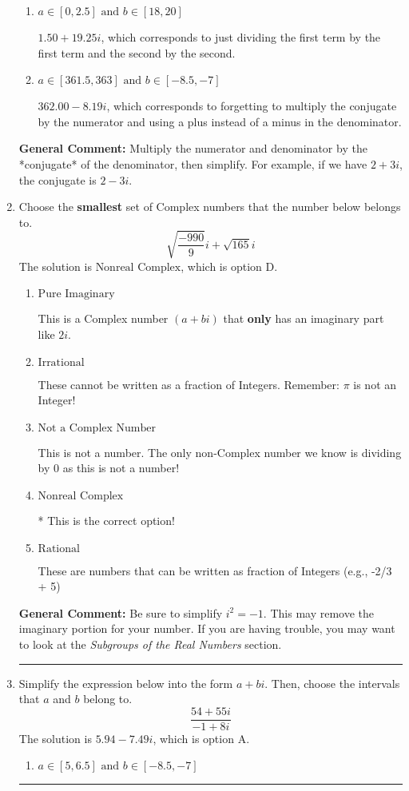 \documentclass{extbook}[14pt]
\newcommand{\litem}[1]{\item #1

\rule{\textwidth}{0.4pt}}
\begin{document}
\begin{enumerate}
{\begin{enumerate}[label=\Alph*.]
 $6.96  - 426.00 i$, which corresponds to forgetting to multiply the conjugate by the numerator.
\item \( a \in [0, 2.5] \text{ and } b \in [18, 20] \)

 $1.50  + 19.25 i$, which corresponds to just dividing the first term by the first term and the second by the second.
\item \( a \in [361.5, 363] \text{ and } b \in [-8.5, -7] \)

 $362.00  - 8.19 i$, which corresponds to forgetting to multiply the conjugate by the numerator and using a plus instead of a minus in the denominator.
\end{enumerate}

\textbf{General Comment:} Multiply the numerator and denominator by the *conjugate* of the denominator, then simplify. For example, if we have $2+3i$, the conjugate is $2-3i$.
}
\litem{
Choose the \textbf{smallest} set of Complex numbers that the number below belongs to.
\[ \sqrt{\frac{-990}{9}} i+\sqrt{165}i \]The solution is \( \text{Nonreal Complex} \), which is option D.\begin{enumerate}[label=\Alph*.]
\item \( \text{Pure Imaginary} \)

This is a Complex number $(a+bi)$ that \textbf{only} has an imaginary part like $2i$.
\item \( \text{Irrational} \)

These cannot be written as a fraction of Integers. Remember: $\pi$ is not an Integer!
\item \( \text{Not a Complex Number} \)

This is not a number. The only non-Complex number we know is dividing by 0 as this is not a number!
\item \( \text{Nonreal Complex} \)

* This is the correct option!
\item \( \text{Rational} \)

These are numbers that can be written as fraction of Integers (e.g., -2/3 + 5)
\end{enumerate}

\textbf{General Comment:} Be sure to simplify $i^2 = -1$. This may remove the imaginary portion for your number. If you are having trouble, you may want to look at the \textit{Subgroups of the Real Numbers} section.
}
\litem{
Simplify the expression below into the form $a+bi$. Then, choose the intervals that $a$ and $b$ belong to.
\[ \frac{54 + 55 i}{-1 + 8 i} \]The solution is \( 5.94  - 7.49 i \), which is option A.\begin{enumerate}[label=\Alph*.]
\item \( a \in [5, 6.5] \text{ and } b \in [-8.5, -7] \)


\end{enumerate}}
\end{enumerate}
\end{document}
